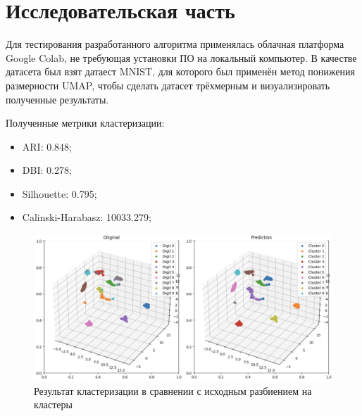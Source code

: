 \chapter{Исследовательская часть}

Для тестирования разработанного алгоритма применялась облачная платформа Google Colab, не требующая установки ПО на локальный компьютер. В качестве датасета был взят датаест MNIST, для которого был применён метод понижения размерности UMAP, чтобы сделать датасет трёхмерным и визуализировать полученные результаты.

Полученные метрики кластеризации:
\begin{itemize}[label*=---]
	\item ARI: 0.848;
	\item DBI: 0.278;
	\item Silhouette: 0.795;
	\item Calinski-Harabasz: 10033.279;
\end{itemize}

\begin{figure}
	\begin{center}
		\includegraphics[width=\textwidth]{images/1.png}
	\end{center}
	\caption{Результат кластеризации в сравнении с исходным разбиением на кластеры}
	\label{img:1}
\end{figure}

